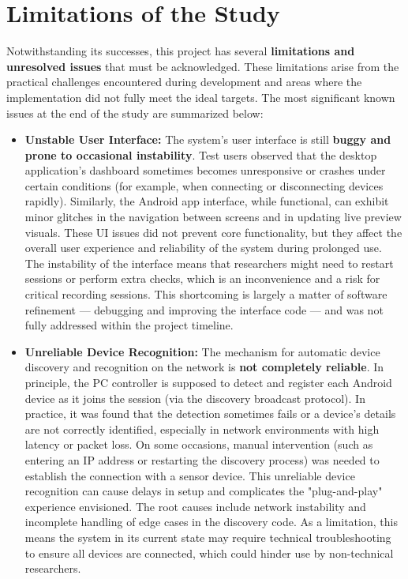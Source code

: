 \documentclass[11pt,a4paper]{report}
\begin{document}
\section{Limitations of the Study}

Notwithstanding its successes, this project has several \textbf{limitations
and unresolved issues} that must be acknowledged. These limitations
arise from the practical challenges encountered during development and
areas where the implementation did not fully meet the ideal targets. The
most significant known issues at the end of the study are summarized
below:

\begin{itemize}
\item \textbf{Unstable User Interface:} The system's user interface is still
  \textbf{buggy and prone to occasional instability}. Test users observed
  that the desktop application's dashboard sometimes becomes
  unresponsive or crashes under certain conditions (for example, when
  connecting or disconnecting devices rapidly). Similarly, the Android
  app interface, while functional, can exhibit minor glitches in the
  navigation between screens and in updating live preview visuals. These
  UI issues did not prevent core functionality, but they affect the
  overall user experience and reliability of the system during prolonged
  use. The instability of the interface means that researchers might
  need to restart sessions or perform extra checks, which is an
  inconvenience and a risk for critical recording sessions. This
  shortcoming is largely a matter of software refinement --- debugging
  and improving the interface code --- and was not fully addressed within
  the project timeline.

\item \textbf{Unreliable Device Recognition:} The mechanism for automatic device
  discovery and recognition on the network is \textbf{not completely
  reliable}. In principle, the PC controller is supposed to detect and
  register each Android device as it joins the session (via the
  discovery broadcast protocol). In practice, it was found that the
  detection sometimes fails or a device's details are not correctly
  identified, especially in network environments with high latency or
  packet loss. On some occasions, manual intervention (such as entering
  an IP address or restarting the discovery process) was needed to
  establish the connection with a sensor device. This unreliable device
  recognition can cause delays in setup and complicates the
  "plug-and-play" experience envisioned. The root causes include network
  instability and incomplete handling of edge cases in the discovery
  code. As a limitation, this means the system in its current state may
  require technical troubleshooting to ensure all devices are connected,
  which could hinder use by non-technical researchers.


\end{itemize}
\end{document}
